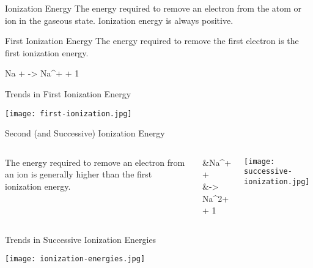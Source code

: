 \documentclass[handout]{beamer}
\begin{document}
\begin{frame}[c]{Ionization Energy}
	The energy required to remove an electron from the atom or ion
	in the gaseous state. Ionization energy is \alert{always}
	positive.

	\bigskip

	\begin{block}{First Ionization Energy}
		The energy required to remove the \alert{first} electron is the
		\alert{first ionization energy}.
		\begin{reaction*}
			Na\gas{} +  -> Na^{+}\gas{} + 1 \el
		\end{reaction*}
	\end{block}
\end{frame}

\begin{frame}{Trends in First Ionization Energy}
	\begin{center}
		\texttt{[image: first-ionization.jpg]}
	\end{center}

\end{frame}

\begin{frame}{Second (and Successive) Ionization Energy}
	\begin{columns}
		The energy required to remove an electron from an \alert{ion} is
		generally higher than the first ionization energy.
		
		\begin{reactions*}
			&Na^{+}\gas{} +  \\
			&\qquad -> Na^{2+}\gas{} + 1 \el
		\end{reactions*}
		\begin{center}
			\texttt{[image: successive-ionization.jpg]}
		\end{center}
	\end{columns}
\end{frame}

\begin{frame}{Trends in Successive Ionization Energies}
	\begin{center}
		\texttt{[image: ionization-energies.jpg]}
	\end{center}
\end{frame}
\end{document}
